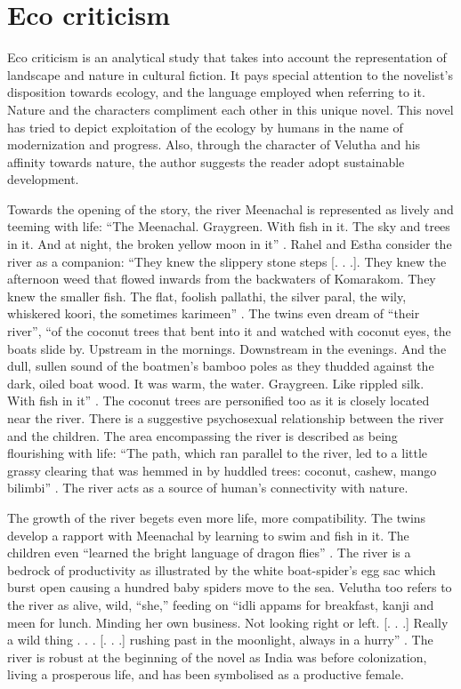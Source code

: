 \section{Eco criticism}

Eco criticism is an analytical study that takes into account the representation of landscape and nature in cultural fiction. It pays special attention to the novelist's disposition towards ecology, and the language employed when referring to it. Nature and the characters compliment each other in this unique novel. This novel has tried to depict exploitation of the ecology by humans in the name of modernization and progress. Also, through the character of Velutha and his affinity towards nature, the author suggests the reader adopt sustainable development.

Towards the opening of the story, the river Meenachal is represented as lively and teeming with life: ``The Meenachal. Graygreen. With fish in it. The sky and trees in it. And at night, the broken yellow moon in it'' \parencite[193]{Roy1997}. Rahel and Estha consider the river as a companion: ``They knew the slippery stone steps [. . .]. They knew the afternoon weed that flowed inwards from the backwaters of Komarakom. They knew the smaller fish. The flat, foolish pallathi, the silver paral, the wily, whiskered koori, the sometimes karimeen'' \parencite[193]{Roy1997}.  The twins even dream of ``their river'', ``of the coconut trees that bent into it and watched with coconut eyes, the boats slide by. Upstream in the mornings. Downstream in the evenings. And the dull, sullen sound of the boatmen's bamboo poles as they thudded against the dark, oiled boat wood. It was warm, the water. Graygreen. Like rippled silk. With fish in it'' \parencite[116]{Roy1997}.  The coconut trees are personified too as it is closely located near the river. There is a suggestive psychosexual relationship between the river and the children. The area encompassing the river is described as being flourishing with life: ``The path, which ran parallel to the river, led to a little grassy clearing that was hemmed in by huddled trees: coconut, cashew, mango bilimbi'' \parencite[195]{Roy1997}. The river acts as a source of human's connectivity with nature.

The growth of the river begets even more life, more compatibility. The twins develop a rapport with Meenachal by learning to swim and fish in it. The children even ``learned the bright language of dragon flies'' \parencite[194]{Roy1997}. The river is a bedrock of productivity as illustrated by the white boat-spider's egg sac which burst open causing a hundred baby spiders move to the sea. Velutha too refers to the river as alive, wild,  ``she,'' feeding on ``idli appams for breakfast, kanji and meen for lunch. Minding her own business. Not looking right or left. [. . .] Really a wild thing . . . [. . .] rushing past in the moonlight, always in a hurry'' \parencite[201]{Roy1997}. The river is robust at the beginning of the novel as India was before colonization, living a prosperous life, and has been symbolised as a productive female. 

